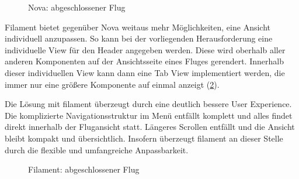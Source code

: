 \begin{figure}[h!]
    \centering
    \caption{Nova: abgeschlossener Flug}
    \label{fig:finished_flight_nova}
\end{figure}

Filament bietet gegenüber Nova weitaus mehr Möglichkeiten, eine Ansicht individuell anzupassen.
So kann bei der vorliegenden Herausforderung eine individuelle View für den Header angegeben werden.
Diese wird oberhalb aller anderen Komponenten auf der Ansichtsseite eines Fluges gerendert.
Innerhalb dieser individuellen View kann dann eine Tab View implementiert werden, die immer nur eine größere Komponente auf einmal anzeigt (\ref{fig:finished_flight_filament}).

Die Lösung mit filament überzeugt durch eine deutlich bessere User Experience.
Die komplizierte Navigationsstruktur im Menü entfällt komplett und alles findet direkt innerhalb der Flugansicht statt.
Längeres Scrollen entfällt und die Ansicht bleibt kompakt und übersichtlich.
Insofern überzeugt filament an dieser Stelle durch die flexible und umfangreiche Anpassbarkeit.

\begin{figure}[h!]
    \centering
    \caption{Filament: abgeschlossener Flug}
    \label{fig:finished_flight_filament}
\end{figure}

